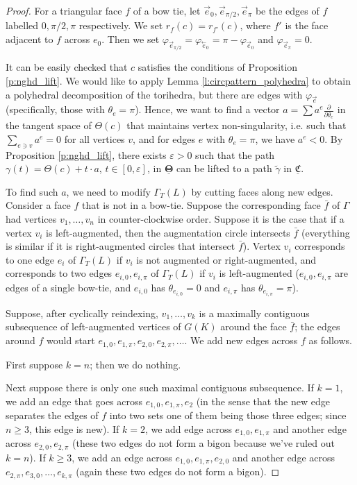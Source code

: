 \documentclass[11pt]{amsart}
\newcommand{\prpref}[1]{Proposition \ref{#1}}
\newcommand{\lemref}[1]{Lemma \ref{#1}}
\newcommand{\CCC}{{\underline{\mathfrak{C}}}}
\newcommand{\TTT}{{\underline{\mathbf{\Theta}}}}
\newcommand{\cev}[1]{\overset{\leftarrow}{#1}}
\newcommand{\del}{\partial}
\newcommand{\ddd}[1]{{\frac{\del}{\del #1}}}
\newcommand{\vphi}{\varphi}
\newcommand{\veps}{\varepsilon}
\theoremstyle{plain}
\theoremstyle{definition}
\begin{document}
\begin{proof}
For a triangular face $f$ of a bow tie,
let $\vec{e}_0, \vec{e}_{\pi/2}, \vec{e}_{\pi}$
be the edges of $f$ labelled $0,\pi/2, \pi$ respectively.
We set $r_f(c) = r_{f'}(c)$,
where $f'$ is the face adjacent to $f$ across $e_0$.
Then we set
$\vphi_{\vec{e}_{\pi/2}} = \vphi_{\cev{e}_0} = \pi - \vphi_{\vec{e}_0}$
and $\vphi_{\vec{e}_{\pi}} = 0$.


It can be easily checked that $c$ satisfies the conditions of
\prpref{p:nghd_lift}.
We would like to apply \lemref{l:circpattern_polyhedra}
to obtain a polyhedral decomposition of the torihedra,
but there are edges with $\vphi_{\vec{e}}$
(specifically, those with $\theta_e = \pi$).
Hence, we want to find a vector $a = \sum a^e \ddd{\theta_e}$
in the tangent space of $\Theta(c)$
that maintains vertex non-singularity,
i.e.  such that $\sum_{e \ni v} a^e = 0$ for all vertices $v$,
and for edges $e$ with $\theta_e = \pi$,
we have $a^e < 0$.
By \prpref{p:nghd_lift}, there exists $\veps > 0$
such that the path $\gamma(t) = \Theta(c) + t \cdot a$, $t\in [0,\veps]$,
in $\TTT$ can be lifted to a path $\tilde{\gamma}$ in $\CCC$.


To find such $a$, we need to modify $\Gamma_T(L)$ by
cutting faces along new edges.
Consider a face $f$ that is not in a bow-tie.
Suppose the corresponding face $\bar{f}$ of $\Gamma$
had vertices $v_1,\ldots,v_n$ in counter-clockwise order.
Suppose it is the case that if a vertex $v_i$ is left-augmented,
then the augmentation circle intersects $\bar{f}$
(everything is similar if it is right-augmented circles that intersect
$\bar{f}$).
Vertex $v_i$ corresponds to one edge $e_i$ of $\Gamma_T(L)$
if $v_i$ is not augmented or right-augmented,
and corresponds to two edges $e_{i,0}, e_{i,\pi}$
of $\Gamma_T(L)$ if $v_i$ is left-augmented
($e_{i,0}, e_{i,\pi}$ are edges of a single bow-tie,
and $e_{i,0}$ has $\theta_{e_{i,0}} = 0$
and $e_{i,\pi}$ has $\theta_{e_{i,\pi}} = \pi$).


Suppose, after cyclically reindexing, $v_1,\ldots,v_k$
is a maximally contiguous subsequence of left-augmented vertices
of $G(K)$ around the face $\bar{f}$;
the edges around $f$ would start
$e_{1,0}, e_{1,\pi}, e_{2,0}, e_{2,\pi}, \ldots$.
We add new edges across $f$ as follows.

First suppose $k=n$; then we do nothing.

Next suppose there is only one such maximal contiguous subsequence.
If $k = 1$, we add an edge that goes across
$e_{1,0},e_{1,\pi},e_2$
(in the sense that the new edge separates the edges of $f$ into two sets
one of them being those three edges;
since $n\geq 3$, this edge is new).
If $k = 2$, we add edge across $e_{1,0},e_{1,\pi}$
and another edge across $e_{2,0},e_{2,\pi}$
(these two edges do not form a bigon because we've ruled out $k=n$).
If $k \geq 3$,
we add an edge across $e_{1,0},e_{1,\pi},e_{2,0}$
and another edge across $e_{2,\pi},e_{3,0},\ldots,e_{k,\pi}$
(again these two edges do not form a bigon).


\end{proof}
\end{document}
